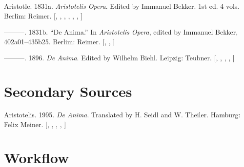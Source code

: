 \documentclass[
  12pt,
  a4paper,
  oneside]{scrbook}
\newlength{\cslhangindent}
\newlength{\cslentryspacingunit} %
\newenvironment{CSLReferences}[2] %
 {%
  \setlength{\parindent}{0pt}
  \ifodd #1
  \let\oldpar\par
  \def\par{\hangindent=\cslhangindent\oldpar}
  \fi
  \setlength{\parskip}{#2\cslentryspacingunit}
 }%
 {}
\begin{document}
\hypertarget{refs_multibib32}{}
\begin{CSLReferences}{1}{0}
\leavevmode{}%
Aristotle. 1831a. \emph{Aristotelis Opera}. Edited by Immanuel Bekker.
1st ed. 4 vols. Berlim: Reimer.
{[},
\protect\hyperlink{cite_37}{\pageref{cite_37}},
\protect\hyperlink{cite_38}{\pageref{cite_38}},
\protect\hyperlink{cite_39}{\pageref{cite_39}},
\protect\hyperlink{cite_45}{\pageref{cite_45}},
\protect\hyperlink{cite_46}{\pageref{cite_46}},
\protect\hyperlink{cite_47}{\pageref{cite_47}}{]}

\leavevmode{}%
---------. 1831b. {``De Anima.''} In \emph{Aristotelis Opera}, edited by
Immanuel Bekker, 402a01--435b25. Berlim: Reimer.
{[},
\protect\hyperlink{cite_40}{\pageref{cite_40}},
\protect\hyperlink{cite_48}{\pageref{cite_48}}{]}

\leavevmode{}%
---------. 1896. \emph{De Anima}. Edited by Wilhelm Biehl. Leipzig:
Teubner. {[},
\protect\hyperlink{cite_41}{\pageref{cite_41}},
\protect\hyperlink{cite_42}{\pageref{cite_42}},
\protect\hyperlink{cite_49}{\pageref{cite_49}},
\protect\hyperlink{cite_50}{\pageref{cite_50}}{]}

\end{CSLReferences}

\hypertarget{secondary-sources}{%
\chapter*{Secondary Sources}\label{secondary-sources}}

\protect\hypertarget{scriv33}{}{}

\hypertarget{refs_multibib33}{}
\begin{CSLReferences}{1}{0}
\leavevmode{}%
Aristotelis. 1995. \emph{De Anima}. Translated by H. Seidl and W.
Theiler. Hamburg: Felix Meiner.
{[},
\protect\hyperlink{cite_43}{\pageref{cite_43}},
\protect\hyperlink{cite_44}{\pageref{cite_44}},
\protect\hyperlink{cite_51}{\pageref{cite_51}},
\protect\hyperlink{cite_52}{\pageref{cite_52}}{]}

\end{CSLReferences}

\hypertarget{workflow}{%
\chapter*{Workflow}\label{workflow}}
\end{document}
